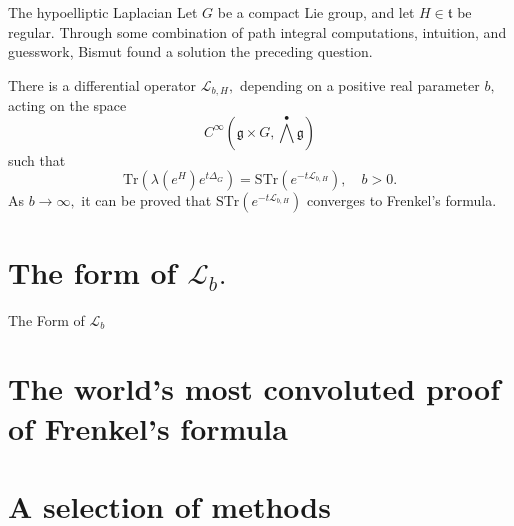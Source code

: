 \documentclass{beamer}
\numberwithin{equation}{section}
\theoremstyle{plain}
\theoremstyle{plain}
\theoremstyle{definition}
\theoremstyle{plain}
\theoremstyle{plain}
\theoremstyle{definition}
\newcommand{\Lc}{\mathcal{L}}
\newcommand{\Tr}{\mathrm{Tr}}
\newcommand{\gf}{\mathfrak{g}}
\newcommand{\tf}{\mathfrak{t}}
\newcommand{\Str}{\mathrm{STr}}
\begin{document}
\begin{frame}{The hypoelliptic Laplacian}
  Let $G$ be a compact Lie group, and let $H\in \tf$ be regular. Through some combination of path integral computations, intuition, and guesswork, Bismut found a solution the preceding question.
  \begin{theorem}
    There is a differential operator $\Lc_{b,H},$ depending on a positive real parameter $b,$ acting on the space
    \[
      C^\infty(\gf\times G,\bigwedge^{\bullet}\gf)
    \]
    such that
    \[
       \Tr(\lambda(e^H)e^{t\Delta_G}) = \Str(e^{-t\Lc_{b,H}}),\quad b>0.
    \]
    As $b\to\infty,$ it can be proved that $\Str(e^{-t\Lc_{b,H}})$ converges to Frenkel's formula.
  \end{theorem}
\end{frame}

\section{The form of $\Lc_b.$}

\begin{frame}
  \huge{The Form of $\Lc_b$}
\end{frame}


\section{The world's most convoluted proof of Frenkel's formula}


\section{A selection of methods}

\begin{frame}
  
\end{frame}


\begin{frame}
\end{frame}
\end{document}
